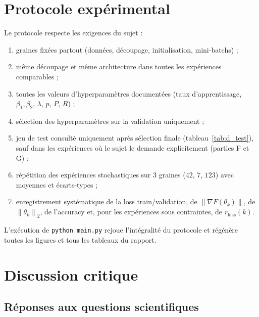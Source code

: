 \documentclass[11pt,a4paper]{article}
\newcommand{\norm}[1]{\left\lVert #1 \right\rVert}
\begin{document}
\section{Protocole expérimental}
\label{sec:protocole}

Le protocole respecte les exigences du sujet :
\begin{enumerate}
  \item graines fixées partout (données, découpage, initialisation, mini-batchs) ;
  \item même découpage et même architecture dans toutes les expériences comparables ;
  \item toutes les valeurs d'hyperparamètres documentées (taux d'apprentissage, $\beta_1, \beta_2$, $\lambda$, $p$, $P$, $R$) ;
  \item sélection des hyperparamètres sur la validation uniquement ;
  \item jeu de test consulté uniquement après sélection finale (tableau~\ref{tab:d_test}), sauf dans les expériences où le sujet le demande explicitement (parties F et G) ;
  \item répétition des expériences stochastiques sur 3 graines ($42$, $7$, $123$) avec moyennes et écarts-types ;
  \item enregistrement systématique de la loss train/validation, de $\norm{\nabla F(\theta_k)}$, de $\norm{\theta_k}_2$, de l'accuracy et, pour les expériences sous contraintes, de $r_{\mathrm{feas}}(k)$.
\end{enumerate}
L'exécution de \texttt{python main.py} rejoue l'intégralité du protocole et régénère toutes les figures et tous les tableaux du rapport.

\section{Discussion critique}
\label{sec:discussion}

\subsection{Réponses aux questions scientifiques}
\label{sec:questions}
\end{document}
